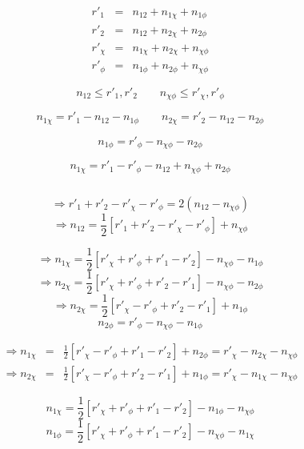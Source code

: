 \documentclass[a4paper]{article}
\begin{document}
\begin{eqnarray*}
  r'_1 & = & n_{12} + n_{1\chi} + n_{1\phi}\\
  r'_2 & = & n_{12} + n_{2\chi} + n_{2\phi}\\
  r'_\chi & = & n_{1\chi} + n_{2\chi} + n_{\chi\phi}\\
  r'_\phi & = & n_{1\phi} + n_{2\phi} + n_{\chi\phi}
\end{eqnarray*}

\[
n_{12} \le r'_1, r'_2 \qquad n_{\chi\phi} \le r'_\chi, r'_\phi
\]

\[
n_{1\chi} = r'_1 - n_{12} - n_{1\phi} \qquad \boxed{ n_{2\chi} = r'_2 - n_{12} - n_{2\phi} }
\]

\[
\boxed{ n_{1\phi} = r'_\phi - n_{\chi\phi} - n_{2\phi} }
\]

\[
\boxed{ n_{1\chi} = r'_1 - r'_\phi - n_{12} + n_{\chi\phi} + n_{2\phi} }
\]

\[

\]

\hline


\[
\Rightarrow r'_1 + r'_2 - r'_\chi - r'_\phi = 2(n_{12} - n_{\chi\phi})
\]
\[
\Rightarrow \boxed{ n_{12} = \frac{1}{2}\left[r'_1 + r'_2 - r'_\chi - r'_\phi\right] + n_{\chi\phi} }
\]

\[
\Rightarrow \boxed{ n_{1\chi} = \frac{1}{2}\left[r'_\chi + r'_\phi + r'_1 - r'_2\right] - n_{\chi\phi} - n_{1\phi} }
\]
\[
\Rightarrow n_{2\chi} = \frac{1}{2}\left[r'_\chi + r'_\phi + r'_2 - r'_1\right] - n_{\chi\phi} - n_{2\phi}
\]
\[
\Rightarrow \boxed{ n_{2\chi} = \frac{1}{2}\left[r'_\chi - r'_\phi + r'_2 - r'_1\right] + n_{1\phi} }
\]
\[
\boxed{ n_{2\phi} = r'_\phi - n_{\chi\phi} - n_{1\phi} }
\]

\begin{eqnarray*}
  \Rightarrow n_{1\chi} & = & \frac{1}{2}\left[r'_\chi - r'_\phi + r'_1 - r'_2\right] + n_{2\phi} = r'_\chi - n_{2\chi} - n_{\chi\phi}\\
  \Rightarrow n_{2\chi} & = & \frac{1}{2}\left[r'_\chi - r'_\phi + r'_2 - r'_1\right] + n_{1\phi} = r'_\chi - n_{1\chi} - n_{\chi\phi}
\end{eqnarray*}

\[
\boxed{ n_{1\chi} = \frac{1}{2}\left[r'_\chi + r'_\phi + r'_1 - r'_2\right] - n_{1\phi} - n_{\chi\phi} }
\]
\[
n_{1\phi} = \frac{1}{2}\left[ r'_\chi + r'_\phi + r'_1 - r'_2 \right] - n_{\chi\phi} - n_{1\chi}
\]
\end{document}
